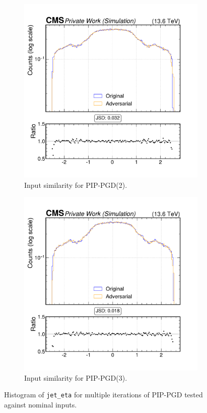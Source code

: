 \begin{figure}[h]
\begin{subfigure}[t]{0.32\textwidth}
    \includegraphics[width=\linewidth]{media/output/features/compare/combined_it_2/cmp_global_features_jet_eta.pdf}
    \caption*{Input similarity for PIP-PGD(2).}
  \end{subfigure}\hfill
  \begin{subfigure}[t]{0.32\textwidth}
    \includegraphics[width=\linewidth]{media/output/features/compare/combined_it_3/cmp_global_features_jet_eta.pdf}
    \caption*{Input similarity for PIP-PGD(3).}
  \end{subfigure}

  \caption*{Histogram of \texttt{jet\_eta} for multiple iterations of PIP-PGD tested against nominal inputs.}
  \label{fig:combined_input_jet_eta}
\end{figure}

